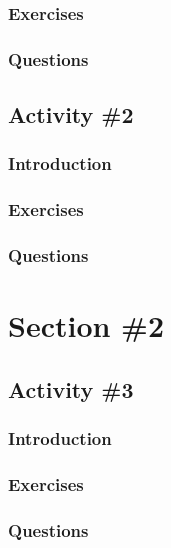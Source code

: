       \subsubsection{Exercises}
      \subsubsection{Questions}

    \subsection{Activity \#2}
      \subsubsection{Introduction}
      \subsubsection{Exercises}
      \subsubsection{Questions}

  \pagebreak

  \section{Section \#2} %
    \subsection{Activity \#3}
      \subsubsection{Introduction}
      \subsubsection{Exercises}    
      \subsubsection{Questions}

